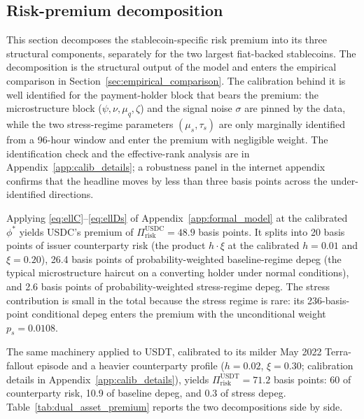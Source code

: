 \subsection{Risk-premium decomposition}\label{sec:identification}

This section decomposes the stablecoin-specific risk premium into its three structural components, separately for the two largest fiat-backed stablecoins. The decomposition is the structural output of the model and enters the empirical comparison in Section~\ref{sec:empirical_comparison}. The calibration behind it is well identified for the payment-holder block that bears the premium: the microstructure block ($\psi, \nu, \mu_q, \zeta$) and the signal noise $\sigma$ are pinned by the data, while the two stress-regime parameters $(\mu_s, \tau_s)$ are only marginally identified from a 96-hour window and enter the premium with negligible weight. The identification check and the effective-rank analysis are in Appendix~\ref{app:calib_details}; a robustness panel in the internet appendix confirms that the headline moves by less than three basis points across the under-identified directions.

Applying \eqref{eq:ellC}--\eqref{eq:ellDs} of Appendix~\ref{app:formal_model} at the calibrated $\phi^*$ yields USDC's premium of $\Pi_{\text{risk}}^{\text{USDC}} = 48.9$ basis points. It splits into 20 basis points of issuer counterparty risk (the product $h \cdot \xi$ at the calibrated $h = 0.01$ and $\xi = 0.20$), 26.4 basis points of probability-weighted baseline-regime depeg (the typical microstructure haircut on a converting holder under normal conditions), and 2.6 basis points of probability-weighted stress-regime depeg. The stress contribution is small in the total because the stress regime is rare: its 236-basis-point conditional depeg enters the premium with the unconditional weight $p_s = 0.0108$.

The same machinery applied to USDT, calibrated to its milder May 2022 Terra-fallout episode and a heavier counterparty profile ($h = 0.02$, $\xi = 0.30$; calibration details in Appendix~\ref{app:calib_details}), yields $\Pi_{\text{risk}}^{\text{USDT}} = 71.2$ basis points: 60 of counterparty risk, 10.9 of baseline depeg, and 0.3 of stress depeg. Table~\ref{tab:dual_asset_premium} reports the two decompositions side by side.

